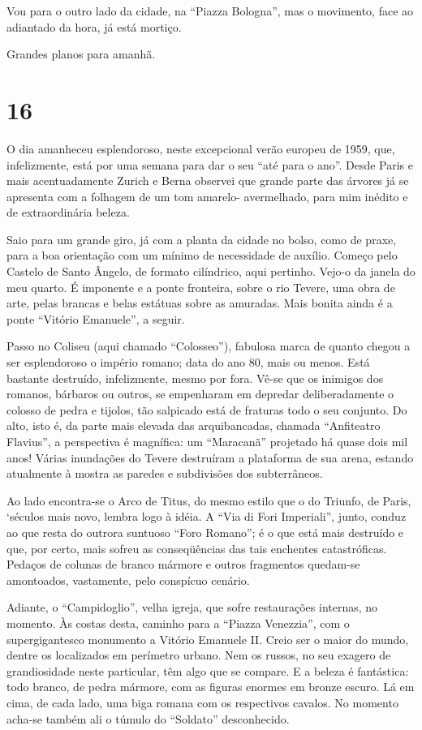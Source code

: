 Vou para o outro lado da cidade, na ``Piazza Bologna'', mas o movimento, face ao adiantado da hora, já está mortiço.

Grandes planos para amanhã.

\section*{16 \adfflatleafright {}}
O dia amanheceu esplendoroso, neste excepcional verão europeu de 1959, que, infelizmente, está por uma semana para dar o seu ``até para o ano''. Desde Paris e mais acentuadamente Zurich e Berna observei que grande parte das árvores já se apresenta com a folhagem de um tom amarelo- avermelhado, para mim inédito e de extraordinária beleza.

Saio para um grande giro, já com a planta da cidade no bolso, como de praxe, para a boa orientação com um mínimo de necessidade de auxílio. Começo pelo Castelo de Santo Ângelo, de formato cilíndrico, aqui pertinho. Vejo-o da janela do meu quarto. É imponente e a ponte fronteira, sobre o rio Tevere, uma obra de arte, pelas brancas e belas estátuas sobre as amuradas. Mais bonita ainda é a ponte ``Vitório Emanuele'', a seguir.

Passo no Coliseu (aqui chamado ``Colosseo''), fabulosa marca de quanto chegou a ser esplendoroso o império romano; data do ano 80, mais ou menos. Está bastante destruído, infelizmente, mesmo por fora. Vê-se que os inimigos dos romanos, bárbaros ou outros, se empenharam em depredar deliberadamente o colosso de pedra e tijolos, tão salpicado está de fraturas todo o seu conjunto. Do alto, isto é, da parte mais elevada das arquibancadas, chamada ``Anfiteatro Flavius'', a perspectiva é magnífica: um ``Maracanã'' projetado há quase dois mil anos! Várias inundações do Tevere destruíram a plataforma de sua arena, estando atualmente à mostra as paredes e subdivisões dos subterrâneos.

Ao lado encontra-se o Arco de Titus, do mesmo estilo que o do Triunfo, de Paris, ‘séculos mais novo, lembra logo à idéia. A ``Via di Fori Imperiali'', junto, conduz ao que resta do outrora suntuoso ``Foro Romano''; é o que está mais destruído e que, por certo, mais sofreu as conseqüências das tais enchentes catastróficas. Pedaços de colunas de branco mármore e outros fragmentos quedam-se amontoados, vastamente, pelo conspícuo cenário.

Adiante, o ``Campidoglio'', velha igreja, que sofre restaurações internas, no momento. Às costas desta, caminho para a ``Piazza Venezzia'', com o supergigantesco monumento a Vitório Emanuele II. Creio ser o maior do mundo, dentre os localizados em perímetro urbano. Nem os russos, no seu exagero de grandiosidade neste particular, têm algo que se compare. E a beleza é fantástica: todo branco, de pedra mármore, com as figuras enormes em bronze escuro. Lá em cima, de cada lado, uma biga romana com os respectivos cavalos. No momento acha-se também ali o túmulo do ``Soldato'' desconhecido.

